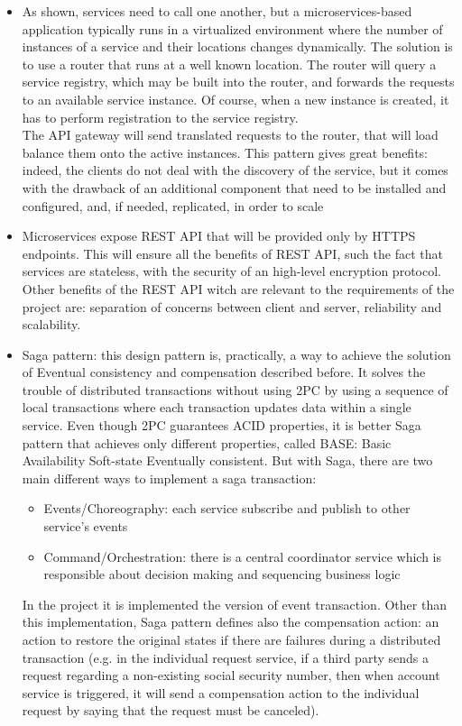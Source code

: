 \begin{itemize}
\item 
As shown, services need to call one another, but a microservices-based application typically runs in a virtualized 
environment where the number of instances of a service and their locations changes dynamically. 
The solution is to use a router that runs at a well known location. 
The router will query a service registry, which may be built into the
router, and forwards the requests to an available service instance.
Of course, when a new instance is created, it has to perform registration to the service registry. \\
The API gateway will send translated requests to the router, that will load balance them onto the active instances.
This pattern gives great benefits: indeed, the clients do not deal with the discovery of the service, but it comes with the drawback of
an additional component that need to be installed and configured, and, if needed, replicated, in order to scale
\item Microservices expose REST API that will be provided only by HTTPS endpoints. This will ensure
all the benefits of REST API, such the fact that services are stateless, with the security of an high-level encryption protocol. Other
benefits of the REST API witch are relevant to the requirements of the project are: separation of concerns between client and server, reliability and scalability.
\item Saga pattern: this design pattern is, practically, a way to achieve the solution of Eventual consistency and compensation described before. It solves the trouble of distributed transactions without using 2PC by using a sequence of local transactions where each transaction updates data within a single service. Even though 2PC guarantees ACID properties, it is better Saga pattern that achieves only different properties, called BASE: Basic Availability Soft-state Eventually consistent.  But with Saga, there are two main different ways to implement a saga transaction:
\begin{itemize}
\item Events/Choreography: each service subscribe and publish to other service's events
\item Command/Orchestration: there is a central coordinator service which is responsible about decision making and sequencing business logic 
\end{itemize}
In the project it is implemented the version of event transaction. Other than this implementation, Saga pattern defines also 
the compensation action: an action to restore the original states if there are failures during a distributed transaction (e.g. in 
the individual request service, if a third party sends a request regarding a non-existing social security number, then when 
account service is triggered, it will send a compensation action to the individual request by saying that the request must be canceled).

\end{itemize}